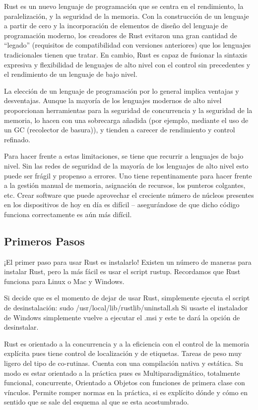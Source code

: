 \documentclass[journal]{IEEEtran}
\begin{document}
Rust es un nuevo lenguaje de programación que se centra en el rendimiento, la paralelización, y la seguridad de la memoria. Con la construcción de un lenguaje a partir de cero y la incorporación de elementos de diseño del lenguaje de programación moderno, los creadores de Rust evitaron una gran cantidad de “legado” (requisitos de compatibilidad con versiones anteriores) que los lenguajes tradicionales tienen que tratar. En cambio, Rust es capaz de fusionar la sintaxis expresiva y flexibilidad de lenguajes de alto nivel con el control sin precedentes y el rendimiento de un lenguaje de bajo nivel.

\vspace{2mm}
La elección de un lenguaje de programación por lo general implica ventajas y desventajas. Aunque la mayoría de los lenguajes modernos de alto nivel proporcionan herramientas para la seguridad de concurrencia y la seguridad de la memoria, lo hacen con una sobrecarga añadida (por ejemplo, mediante el uso de un GC (recolector de basura)), y tienden a carecer de rendimiento y control refinado.

\vspace{2mm}
Para hacer frente a estas limitaciones, se tiene que recurrir a lenguajes de bajo nivel. Sin las redes de seguridad de la mayoría de los lenguajes de alto nivel esto puede ser frágil y propenso a errores. Uno tiene repentinamente para hacer frente a la gestión manual de memoria, asignación de recursos, los punteros colgantes, etc. Crear software que puede aprovechar el creciente número de núcleos presentes en los dispositivos de hoy en día es difícil – asegurándose de que dicho código funciona correctamente es aún más difícil.

\subsection{Primeros Pasos}
¡El primer paso para usar Rust es instalarlo! Existen un número de maneras para instalar Rust, pero la más fácil es usar el script rustup. Recordamos que Rust funciona para Linux o Mac y Windows.

Si decide que es el momento de dejar de usar Rust, simplemente ejecuta el script de desinstalación:  sudo /usr/local/lib/rustlib/uninstall.sh
Si usaste el instalador de Windows simplemente vuelve a ejecutar el .msi y este te dará la opción de desinstalar.

\vspace{2mm}

Rust es orientado a la concurrencia y a la eficiencia con el control de la memoria explícita pues tiene control de localización y de etiquetas. Tareas de peso muy ligero del tipo de co-rutinas. Cuenta con una compilación nativa y estática. Su modo es estar orientado a la práctica pues es Multiparadigmático, totalmente funcional, concurrente, Orientado a Objetos con funciones de primera clase con vínculos. Permite romper normas en la práctica, si es explícito dónde y cómo en sentido que se sale del esquema al que se esta acostumbrado.
\end{document}
